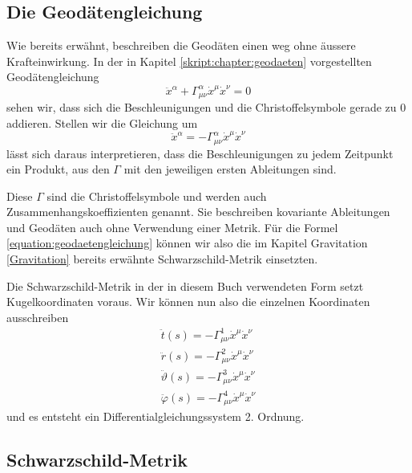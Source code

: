 \begin{refsection}
	\subsection{Die Geodätengleichung}\label{skript:chapter:zeitreisen:geodaetengl}
	Wie bereits erwähnt, beschreiben die Geodäten einen weg ohne äussere Krafteinwirkung. In der in Kapitel \ref{skript:chapter:geodaeten} vorgestellten Geodätengleichung
	\begin{equation}
	\ddot{x}^{\alpha} + \Gamma^{\alpha}_{\mu\nu}\dot{x}^{\mu}\dot{x}^{\nu} = 0
	\end{equation}
    sehen wir, dass sich die Beschleunigungen und die Christoffelsymbole gerade zu $0$ addieren.
	Stellen wir die Gleichung um	
	\begin{equation}\label{equation:geodaetengleichung}
	\ddot{x}^{\alpha} = -\Gamma^{\alpha}_{\mu\nu}\dot{x}^{\mu}\dot{x}^{\nu}
	\end{equation}
	lässt sich daraus interpretieren, dass die Beschleunigungen zu jedem Zeitpunkt ein Produkt, aus den $\Gamma$ mit den jeweiligen ersten Ableitungen sind.
    
	Diese $\Gamma$ sind die Christoffelsymbole und werden auch Zusammenhangskoeffizienten genannt. Sie beschreiben kovariante Ableitungen und Geodäten auch ohne Verwendung einer Metrik. Für die Formel \eqref{equation:geodaetengleichung} können wir also die im Kapitel Gravitation \ref{Gravitation} bereits erwähnte Schwarzschild-Metrik einsetzten.	
	 
	Die Schwarzschild-Metrik in der in diesem Buch verwendeten Form setzt Kugelkoordinaten voraus. Wir können nun also die einzelnen Koordinaten ausschreiben 	
	\begin{equation}\label{skript:chapter:zeitreisen:geodaeten4dim}
	\begin{aligned}
	\ddot{t}(s) = -\Gamma^{1}_{\mu\nu}\dot{x}^{\mu}\dot{x}^{\nu}\\
	\ddot{r}(s) = -\Gamma^{2}_{\mu\nu}\dot{x}^{\mu}\dot{x}^{\nu}\\
	\ddot{\vartheta}(s) = -\Gamma^{3}_{\mu\nu}\dot{x}^{\mu}\dot{x}^{\nu}\\
	\ddot{\varphi}(s) = -\Gamma^{4}_{\mu\nu}\dot{x}^{\mu}\dot{x}^{\nu}	
	\end{aligned}
	\end{equation}
    und es entsteht ein Differentialgleichungssystem 2. Ordnung.

	\subsection{Schwarzschild-Metrik}\label{skript:chapter:zeitreisen:schwarzschildmetrik}
	

\end{refsection}
